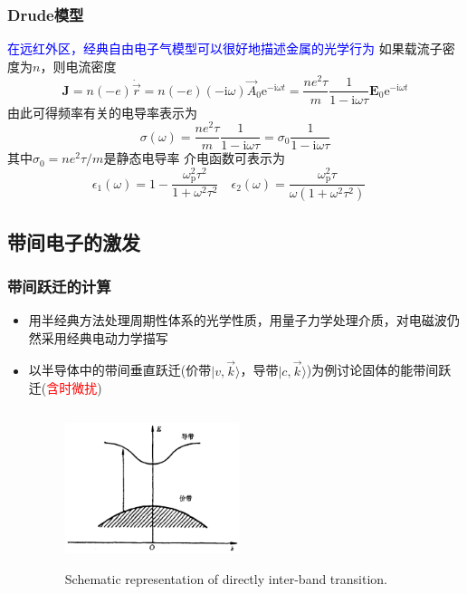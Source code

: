 \frame
{
	\frametitle{\textrm{Drude}模型}
	\textcolor{blue}{在远红外区，经典自由电子气模型可以很好地描述金属的光学行为}
	如果载流子密度为$n$，则电流密度
	\begin{displaymath}
		\mathbf{J}=n(-e)\dot{\vec r}=n(-e)(-\mathrm{i}\omega)\vec A_0\mathrm{e}^{-\mathrm{i}\omega t}=\frac{ne^2\tau}m\frac1{1-\mathrm{i}\omega\tau}\mathbf{E}_0\mathrm{e}^{-\mathrm{i}\omega t}
	\end{displaymath}
	由此可得频率有关的电导率表示为
	\begin{displaymath}
		\sigma(\omega)=\frac{ne^2\tau}m\frac1{1-\mathrm{i}\omega\tau}=\sigma_0\frac1{1-\mathrm{i}\omega\tau}
	\end{displaymath}
	其中$\sigma_0=ne^2\tau/m$是静态电导率
	介电函数可表示为
	\begin{displaymath}
	\epsilon_1(\omega)=1-\frac{\omega_{\mathrm{p}}^2\tau^2}{1+\omega^2\tau^2}\quad \epsilon_2(\omega)=\frac{\omega_{\mathrm{p}}^2\tau}{\omega(1+\omega^2\tau^2)}\quad
\end{displaymath}
}

\subsection{带间电子的激发}
\frame
{
\frametitle{带间跃迁的计算}
\begin{itemize}
\setlength{\itemsep}{10pt}
	\item 用半经典方法处理周期性体系的光学性质，用量子力学处理介质，对电磁波仍然采用经典电动力学描写
	\item 以半导体中的带间垂直跃迁(价带$|v,\vec k\rangle$，导带$|c,\vec k\rangle$)为例讨论固体的能带间跃迁(\textcolor{red}{含时微扰})
\begin{figure}[h!]
\centering
\vspace*{-0.2in}
\includegraphics[height=1.8in,width=2.0in,viewport=0 0 1000 900,clip]{Figures/optic_dir.png}
\caption{\fontsize{8.0pt}{5.2pt}\selectfont\textrm{Schematic representation of directly inter-band transition.}}%
\label{Optic-dir}
\end{figure} 
\end{itemize}
}

